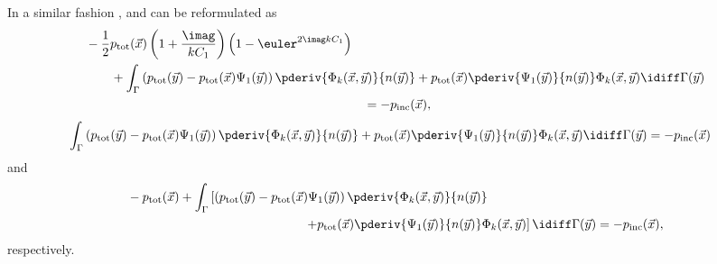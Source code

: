 In a similar fashion ,  and  can be reformulated as 
\begin{align*}
	&-\frac{1}{2}p_{\mathrm{tot}}(\vec{x})\left(1+\frac{\imag}{kC_1}\right)\left(1-\euler^{2\imag kC_1}\right) \\
	&\qquad+\int_\Gamma \left(p_{\mathrm{tot}}(\vec{y}) - p_{\mathrm{tot}}(\vec{x})\Psi_1(\vec{y})\right)\pderiv{\Phi_k(\vec{x},\vec{y})}{n(\vec{y})}+ p_{\mathrm{tot}}(\vec{x})\pderiv{\Psi_1(\vec{y})}{n(\vec{y})} \Phi_k(\vec{x},\vec{y})\idiff\Gamma(\vec{y})\\
	&{\hskip22em\relax}=-p_{\mathrm{inc}}(\vec{x}),
\end{align*}
\begin{align*}
	&\int_\Gamma \left(p_{\mathrm{tot}}(\vec{y}) - p_{\mathrm{tot}}(\vec{x})\Psi_1(\vec{y})\right)\pderiv{\Phi_k(\vec{x},\vec{y})}{n(\vec{y})}+ p_{\mathrm{tot}}(\vec{x})\pderiv{\Psi_1(\vec{y})}{n(\vec{y})} \Phi_k(\vec{x},\vec{y})\idiff\Gamma(\vec{y}) =-p_{\mathrm{inc}}(\vec{x})
\end{align*}
and
\begin{align*}
	&-p_{\mathrm{tot}}(\vec{x})+\int_\Gamma\left[\left(p_{\mathrm{tot}}(\vec{y}) - p_{\mathrm{tot}}(\vec{x})\Psi_1(\vec{y})\right)\pderiv{\Phi_k(\vec{x},\vec{y})}{n(\vec{y})}\right.\\
	&{\hskip14em\relax}\left. + p_{\mathrm{tot}}(\vec{x})\pderiv{\Psi_1(\vec{y})}{n(\vec{y})} \Phi_k(\vec{x},\vec{y})\right]\idiff\Gamma(\vec{y})=-p_{\mathrm{inc}}(\vec{x}),
\end{align*}
respectively.

